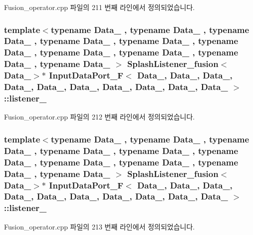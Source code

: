 Fusion\+\_\+operator.\+cpp 파일의 211 번째 라인에서 정의되었습니다.

\subsubsection[{\texorpdfstring{listener\+\_\+1}{listener_1}}]{\setlength{\rightskip}{0pt plus 5cm}template$<$typename Data\+\_ , typename Data\+\_ , typename Data\+\_ , typename Data\+\_ , typename Data\+\_ , typename Data\+\_ , typename Data\+\_ , typename Data\+\_ , typename Data\+\_ , typename Data\+\_ $>$ {\bf Splash\+Listener\+\_\+fusion}$<$Data\+\_$>$$\ast$ {\bf Input\+Data\+Port\+\_\+F}$<$ Data\+\_, Data\+\_, Data\+\_, Data\+\_, Data\+\_, Data\+\_, Data\+\_, Data\+\_, Data\+\_, Data\+\_ $>$\+::listener\+\_}\hypertarget{classInputDataPort__F_a3c5532c1682ea7ce7aef4b3f50923f51}{}\label{classInputDataPort__F_a3c5532c1682ea7ce7aef4b3f50923f51}


Fusion\+\_\+operator.\+cpp 파일의 212 번째 라인에서 정의되었습니다.

\subsubsection[{\texorpdfstring{listener\+\_\+2}{listener_2}}]{\setlength{\rightskip}{0pt plus 5cm}template$<$typename Data\+\_ , typename Data\+\_ , typename Data\+\_ , typename Data\+\_ , typename Data\+\_ , typename Data\+\_ , typename Data\+\_ , typename Data\+\_ , typename Data\+\_ , typename Data\+\_ $>$ {\bf Splash\+Listener\+\_\+fusion}$<$Data\+\_$>$$\ast$ {\bf Input\+Data\+Port\+\_\+F}$<$ Data\+\_, Data\+\_, Data\+\_, Data\+\_, Data\+\_, Data\+\_, Data\+\_, Data\+\_, Data\+\_, Data\+\_ $>$\+::listener\+\_}\hypertarget{classInputDataPort__F_ac54eb8cc1b48c4e414add9fd1fed9725}{}\label{classInputDataPort__F_ac54eb8cc1b48c4e414add9fd1fed9725}


Fusion\+\_\+operator.\+cpp 파일의 213 번째 라인에서 정의되었습니다.

